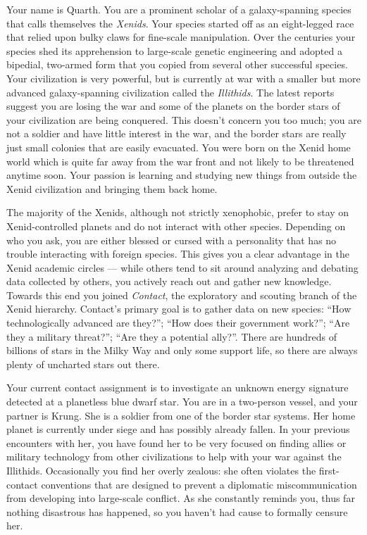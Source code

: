 \documentclass[char]{guildcamp1}
\begin{document}
\name{\cPassive{}}


Your name is Quarth. You are a prominent scholar of a galaxy-spanning species that calls themselves the \emph{Xenids}. Your species started off as an eight-legged race that relied upon bulky claws for fine-scale manipulation. Over the centuries your species shed its apprehension to large-scale genetic engineering and adopted a bipedial, two-armed form that you copied from several other successful species. Your civilization is very powerful, but is currently at war with a smaller but more advanced galaxy-spanning civilization called the \emph{Illithids}. The latest reports suggest you are losing the war and some of the planets on the border stars of your civilization are being conquered. This doesn't concern you too much; you are not a soldier and have little interest in the war, and the border stars are really just small colonies that are easily evacuated. You were born on the Xenid home world which is quite far away from the war front and not likely to be threatened anytime soon. Your passion is learning and studying new things from outside the Xenid civilization and bringing them back home.

The majority of the Xenids, although not strictly xenophobic, prefer to stay on Xenid-controlled planets and do not interact with other species. Depending on who you ask, you are either blessed or cursed with a personality that has no trouble interacting with foreign species. This gives you a clear advantage in the Xenid academic circles --- while others tend to sit around analyzing and debating data collected by others, you actively reach out and gather new knowledge. Towards this end you joined \emph{Contact}, the exploratory and scouting branch of the Xenid hierarchy. Contact's primary goal is to gather data on new species: ``How technologically advanced are they?''; ``How does their government work?''; ``Are they a military threat?''; ``Are they a potential ally?''. There are hundreds of billions of stars in the Milky Way and only some support life, so there are always plenty of uncharted stars out there.

Your current contact assignment is to investigate an unknown energy signature detected at a planetless blue dwarf star. You are in a two-person vessel, and your partner is Krung. She is a soldier from one of the border star systems. Her home planet is currently under siege and has possibly already fallen. In your previous encounters with her, you have found her to be very focused on finding allies or military technology from other civilizations to help with your war against the Illithids. Occasionally you find her overly zealous: she often violates the first-contact conventions that are designed to prevent a diplomatic miscommunication from developing into large-scale conflict. As she constantly reminds you, thus far nothing disastrous has happened, so you haven't had cause to formally censure her.
\end{document}
